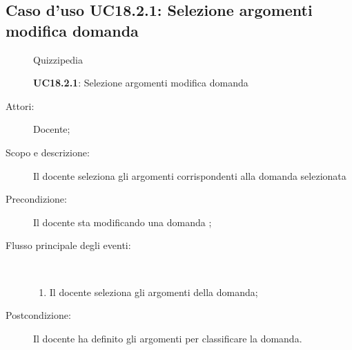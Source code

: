 \subsection{Caso d'uso UC18.2.1: Selezione argomenti modifica domanda}
	\begin{figure}[H]
		\centering
		\begin{resizedtikzpicture}{\textwidth}
		\begin{umlsystem}[x=0, fill=lightgray!20]{Quizzipedia}
		\end{umlsystem}
		\end{resizedtikzpicture}
		\caption{\textbf{UC18.2.1}: Selezione argomenti modifica domanda}
		\label{UC18.2.1}
	\end{figure}
\begin{description}
\item[Attori:] Docente;
\item[Scopo e descrizione:] Il docente seleziona gli argomenti corrispondenti alla domanda selezionata
      \item[Precondizione:] Il docente sta modificando una domanda
;

        \item[Flusso principale degli eventi:] \ 
 \begin{enumerate}
          \item Il docente seleziona gli argomenti della domanda;

      \end{enumerate}
    \item[Postcondizione:] Il docente ha definito gli argomenti per classificare la domanda.
  \end{description}
\hypertarget{UC18.2.2}{}
